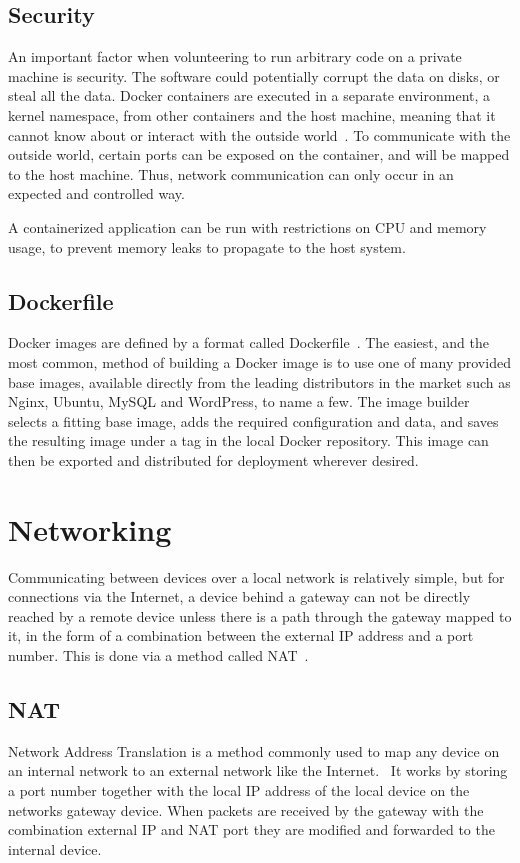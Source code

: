 \subsection{Security}
An important factor when volunteering to run arbitrary code on a private machine is security. The software could potentially corrupt the data on disks, or steal all the data. 
Docker containers are executed in a separate environment, a kernel namespace, from other containers and the host machine, meaning that it cannot know about or interact with the outside world~\cite{docker-security}. To communicate with the outside world, certain ports can be exposed on the container, and will be mapped to the host machine. Thus, network communication can only occur in an expected and controlled way. 

A containerized application can be run with restrictions on CPU and memory usage, to prevent memory leaks to propagate to the host system.

\subsection{Dockerfile}
Docker images are defined by a format called Dockerfile~\cite{docker-dockerfile}. The easiest, and the most common, method of building a Docker image is to use one of many provided base images, available directly from the leading distributors in the market such as Nginx, Ubuntu, MySQL and WordPress, to name a few. The image builder selects a fitting base image, adds the required configuration and data, and saves the resulting image under a tag in the local Docker repository. This image can then be exported and distributed for deployment wherever desired.

\section{Networking}
Communicating between devices over a local network is relatively simple, but for connections via the Internet, a device behind a gateway can not be directly reached by a remote device unless there is a path through the gateway mapped to it, in the form of a combination between the external IP address and a port number. This is done via a method called NAT~\cite{kurose:p349}. 

\subsection{NAT}
Network Address Translation is a method commonly used to map any device on an internal network to an external network like the Internet.~\cite{kurose:p349} It works by storing a port number together with the local IP address of the local device on the networks gateway device. When packets are received by the gateway with the combination external IP and NAT port they are modified and forwarded to the internal device.

